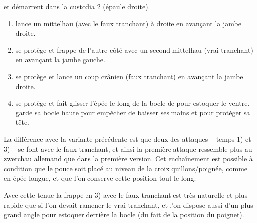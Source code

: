 \begin{technique}
\A et \D démarrent dans la custodia 2 (épaule droite).

\begin{enumerate}
	\item \A lance un mittelhau (avec le faux tranchant) à droite en avançant la jambe droite.
	
	\item \D se protège et \A frappe de l'autre côté avec un second mittelhau (vrai tranchant) en avançant la jambe gauche.
	
	\item \D se protège et \A lance un coup crânien (faux tranchant) en avançant la jambe droite.
	
	\item \D se protège et \A fait glisser l'épée le long de la bocle de \D pour estoquer le ventre.
		\A garde sa bocle haute pour empêcher \D de baisser ses mains et pour protéger sa tête.
\end{enumerate}

La différence avec la variante précédente est que deux des attaques – temps 1) et 3) – se font avec le faux tranchant, et ainsi la première attaque ressemble plus au zwerchau allemand que dans la première version.
Cet enchaînement est possible à condition que le pouce soit placé au niveau de la croix quillons/poignée, comme en épée longue, et que l'on conserve cette position tout le long.

Avec cette tenue la frappe en 3) avec le faux tranchant est très naturelle et plus rapide que si l'on devait ramener le vrai tranchant, et l'on dispose aussi d'un plus grand angle pour estoquer derrière la bocle (du fait de la position du poignet).

\end{technique}

